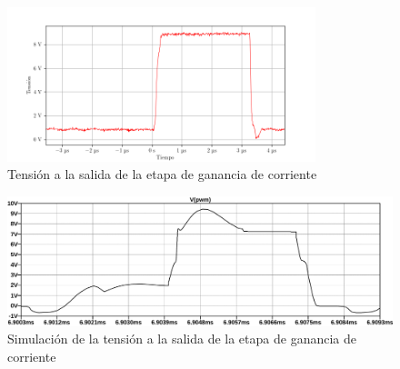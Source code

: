 \begin{figure}[H]
    \centering
    \includegraphics[width=0.8\textwidth]{images/capturas-osciloscopio/17-11-2022/3.png}
    \caption{Tensión a la salida de la etapa de ganancia de corriente}
    \label{fig:osc:3}
\end{figure}

\begin{figure}[H]
    \centering
    \includegraphics[width=\textwidth]{images/sim/3.pdf}
    \caption{Simulación de la tensión a la salida de la etapa de ganancia de corriente}
    \label{fig:sim:3}
\end{figure}






